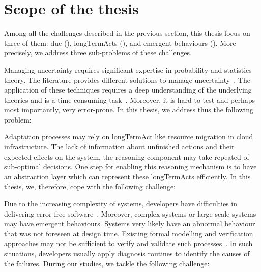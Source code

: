 \section{Scope of the thesis}
\label{sec:intro:scope}

Among all the challenges described in the previous section, this thesis focus on three of them: \gls{duc} (), \glspl{longTermAct} (), and emergent behaviours ().
More precisely, we address three sub-problems of these challenges.

Managing uncertainty requires significant expertise in probability and statistics theory.
The literature provides different solutions to manage uncertainty~\cite{zadeh1996fuzzy,metrology2008evaluation,shafer1992dempster}.
The application of these techniques requires a deep understanding of the underlying theories and is a time-consuming task~\cite{DBLP:conf/quatic/VallecilloMO16}.
Moreover, it is hard to test and perhaps most importantly, very error-prone.
In this thesis, we address thus the following problem:
\vspace{-2em}

Adaptation processes may rely on \gls{longTermAct} like resource migration in cloud infrastructure.
The lack of information about unfinished actions and their expected effects on the system, the reasoning component may take repeated of sub-optimal decisions.
One step for enabling this reasoning mechanism is to have an abstraction layer which can represent these \glspl{longTermAct} efficiently.
In this thesis, we, therefore, cope with the following challenge:
\vspace{-2em}

Due to the increasing complexity of systems, developers have difficulties in delivering error-free software~\cite{DBLP:conf/icse/BarbosaLMJ17, DBLP:conf/icse/MongielloPS15, DBLP:conf/icse/HassanBB15}.
Moreover, complex systems or large-scale systems may have emergent behaviours.
Systems very likely have an abnormal behaviour that was not foreseen at design time.
Existing formal modelling and verification approaches may not be sufficient to verify and validate such processes~\cite{DBLP:conf/icse/TaharaOH17}.
In such situations, developers usually apply diagnosis routines to identify the causes of the failures.
During our studies, we tackle the following challenge:
\vspace{-2em}

